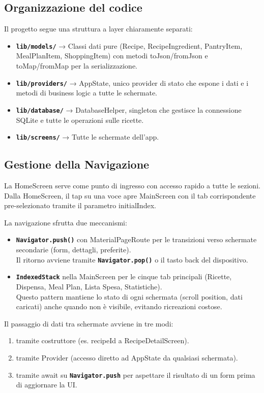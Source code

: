 \documentclass[a4paper, 12pt]{article}
\begin{document}
\subsection{Organizzazione del codice}
Il progetto segue una struttura a layer chiaramente separati:
\begin{itemize}
    \item \textbf{\texttt{lib/models/}} → Classi dati pure (Recipe, RecipeIngredient, PantryItem, MealPlanItem, ShoppingItem) con metodi toJson/fromJson e toMap/fromMap per la serializzazione.
    \item \textbf{\texttt{lib/providers/}}  → AppState, unico provider di stato che espone i dati e i metodi di business logic a tutte le schermate.
    \item \textbf{\texttt{lib/database/}}  → DatabaseHelper, singleton che gestisce la connessione SQLite e tutte le operazioni sulle ricette.
    \item \textbf{\texttt{lib/screens/}}  → Tutte le schermate dell’app.
\end{itemize}

\subsection{Gestione della Navigazione}
La HomeScreen serve come punto di ingresso con accesso rapido a tutte le sezioni. 
Dalla HomeScreen, il tap su una voce apre MainScreen con il tab corrispondente pre-selezionato tramite il parametro initialIndex.
\vspace{0.5 cm}

La navigazione sfrutta due meccanismi:
\begin{itemize}
    \item \textbf{\texttt{Navigator.push()}} con MaterialPageRoute per le transizioni verso schermate secondarie (form, dettagli, preferite). \\ 
    Il ritorno avviene tramite \textbf{\texttt{Navigator.pop()}} o il tasto back del dispositivo.
    \item \textbf{\texttt{IndexedStack}} nella MainScreen per le cinque tab principali (Ricette, Dispensa, Meal Plan, Lista Spesa, Statistiche).\\
    Questo pattern mantiene lo stato di ogni schermata (scroll position, dati caricati) anche quando non è visibile, evitando ricreazioni costose.
\end{itemize}
\vspace{0.5 cm}

Il passaggio di dati tra schermate avviene in tre modi: 
\begin{enumerate}
    \item tramite costruttore (es. recipeId a RecipeDetailScreen).
    \item tramite Provider (accesso diretto ad AppState da qualsiasi schermata).
    \item tramite await su \textbf{\texttt{Navigator.push}} per aspettare il risultato di un form prima di aggiornare la UI.
\end{enumerate}
\end{document}
